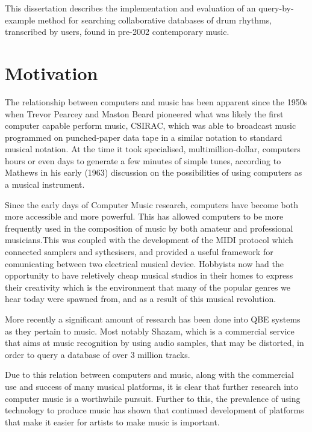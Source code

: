 \documentclass[12pt,twoside,notitlepage]{report}
\begin{document}
	This dissertation describes the implementation and evaluation of an query-by-example method for searching collaborative databases of drum rhythms, transcribed by users, found in pre-2002 contemporary music.
	
	\section{\label{sec:Motivation}Motivation}
	The relationship between computers and music has been apparent since the 1950s when Trevor Pearcey and Maston Beard pioneered what was likely the first computer capable perform music, CSIRAC\footnotemark {}, which was able to broadcast music programmed on punched-paper data tape in a similar notation to standard musical notation\cite{CSIRAC}. At the time it took specialised, multimillion-dollar, computers hours or even days to generate a few minutes of simple tunes, according to Mathews in his early (1963) discussion on the possibilities of using computers as a musical instrument\cite{Mathews1963}.
	
	Since the early days of Computer Music research, computers have become both more accessible and more powerful. This has allowed computers to be more frequently used in the composition of music by both amateur and professional musicians.This was coupled with the development of the MIDI protocol\footnotemark {} which connected samplers and sythesisers, and provided a useful framework for comunicating between two electrical musical device. Hobbyists now had the opportunity to have reletively cheap musical studios in their homes to express their creativity which is the environment that many of the popular genres we hear today were spawned from, and as a result of this musical revolution.
	
	More recently a significant amount of research has been done into QBE\footnotemark {} systems as they pertain to music. Most notably Shazam\cite{Shazam}, which is a commercial service that aims at music recognition by using audio samples, that may be distorted, in order to query a database of over 3 million tracks.
	
	Due to this relation between computers and music, along with the commercial use and success of many musical platforms, it is clear that further research into computer music is a worthwhile pursuit. Further to this, the prevalence of using technology to produce music has shown that continued development of platforms that make it easier for artists to make music is important.
	
\end{document}
